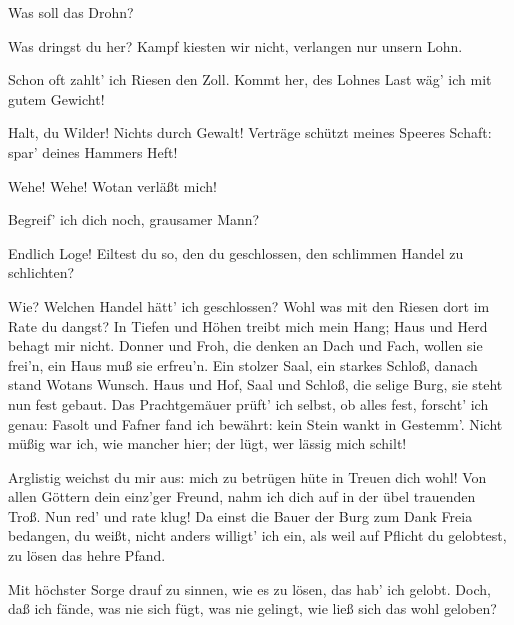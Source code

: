 \begin{drama}
\Fafnerspeaks
Was soll das Drohn?
 

\Fasoltspeaks
Was dringst du her?
Kampf kiesten wir nicht,
verlangen nur unsern Lohn.
 

\Donnerspeaks
Schon oft zahlt' ich Riesen den Zoll.
Kommt her, des Lohnes Last
wäg' ich mit gutem Gewicht!
 




\Wotanspeaks


Halt, du Wilder! Nichts durch Gewalt!
Verträge schützt meines Speeres Schaft:
spar' deines Hammers Heft!
 

\Freiaspeaks
Wehe! Wehe! Wotan verläßt mich!
 

\Frickaspeaks
Begreif' ich dich noch, grausamer Mann?
 

\Wotanspeaks


Endlich Loge! Eiltest du so,
den du geschlossen,
den schlimmen Handel zu schlichten?
 

\Logespeaks


Wie? Welchen Handel hätt' ich geschlossen?
Wohl was mit den Riesen dort im Rate du dangst?
In Tiefen und Höhen treibt mich mein Hang;
Haus und Herd behagt mir nicht.
Donner und Froh,
die denken an Dach und Fach,
wollen sie frei'n,
ein Haus muß sie erfreu'n.
Ein stolzer Saal, ein starkes Schloß,
danach stand Wotans Wunsch.
Haus und Hof, Saal und Schloß,
die selige Burg, sie steht nun fest gebaut.
Das Prachtgemäuer prüft' ich selbst,
ob alles fest, forscht' ich genau:
Fasolt und Fafner fand ich bewährt:
kein Stein wankt in Gestemm'.
Nicht müßig war ich, wie mancher hier;
der lügt, wer lässig mich schilt!
 

\Wotanspeaks
Arglistig weichst du mir aus:
mich zu betrügen hüte in Treuen dich wohl!
Von allen Göttern dein einz'ger Freund,
nahm ich dich auf in der übel trauenden Troß.
Nun red' und rate klug!
Da einst die Bauer der Burg
zum Dank Freia bedangen,
du weißt, nicht anders willigt' ich ein,
als weil auf Pflicht du gelobtest,
zu lösen das hehre Pfand.
 

\Logespeaks
Mit höchster Sorge drauf zu sinnen,
wie es zu lösen, das hab' ich gelobt.
Doch, daß ich fände,
was nie sich fügt, was nie gelingt,
wie ließ sich das wohl geloben?
 


\end{drama}
